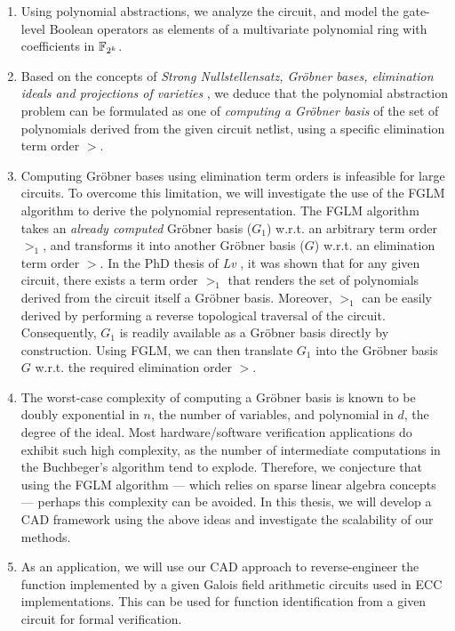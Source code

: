 \begin{enumerate}
\item Using polynomial abstractions, we analyze the circuit, and
  model the gate-level Boolean operators as elements of a multivariate
  polynomial ring with coefficients in ${\mathbb{F}}_{2^k}$.

\item Based on the concepts of {\it Strong Nullstellensatz, Gr\"obner
  bases, elimination ideals and projections of varieties}
  \cite{ideals:book}, we deduce that the polynomial abstraction
  problem can be formulated as one of {\it computing a Gr\"obner
    basis} of the set of polynomials derived from the given circuit
  netlist, using a specific elimination term order $>$.

\item Computing Gr\"obner bases using elimination term orders is
  infeasible for large circuits. To overcome this limitation, we will
  investigate the use of the FGLM algorithm \cite{fglm} to derive the
  polynomial representation. The FGLM algorithm takes an {\it already
    computed} Gr\"obner basis ($G_1$) w.r.t. an arbitrary term order
  $>_1$, and transforms it into another Gr\"obner basis ($G$)
  w.r.t. an elimination term order $>$. In the PhD thesis of {\it
  Lv} \cite{lv:phd}, it was shown that for any given
  circuit, there exists a term order $>_1$ that renders the set of
  polynomials derived from the circuit itself a Gr\"obner
  basis. Moreover, $>_1$ can be easily derived by performing a reverse
  topological traversal of the circuit. Consequently, $G_1$ is readily
  available as a Gr\"obner basis directly by construction. Using FGLM,
  we can then translate $G_1$ into the Gr\"obner basis $G$
  w.r.t. the required elimination order $>$. 

\item The worst-case complexity of computing a Gr\"obner basis is
  known to be doubly exponential in $n$, the number of variables, and
  polynomial in $d$, the degree of the ideal. Most hardware/software
  verification applications do exhibit such high complexity, as the
  number of intermediate computations in the Buchbeger's algorithm
  \cite{buchberger_thesis} 
  tend to explode. Therefore, we conjecture that using the FGLM
  algorithm --- which relies on sparse linear algebra concepts ---
  perhaps this complexity can be avoided. In this thesis, we will
  develop a CAD framework using the above ideas and investigate the
  scalability of our methods.

\item As an application, we will use our CAD approach to
  reverse-engineer the function implemented by a given Galois field
  arithmetic circuits used in ECC   implementations. This can be used
  for function identification from a given circuit for formal
  verification. 

\end{enumerate}

